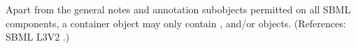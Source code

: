 Apart from the general notes and annotation subobjects permitted on all
SBML components, a \ListOfRules container object may only contain
\AssignmentRule, \AlgebraicRule and/or \RateRule objects.  (References:
SBML L3V2 .)
